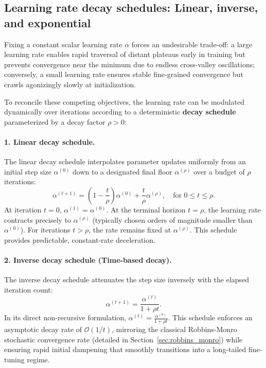 \subsection{Learning rate decay schedules: Linear, inverse, and exponential}
\label{sec:learning_rate_decay_schedules}

Fixing a constant scalar learning rate $\alpha$ forces an undesirable trade-off: a large learning rate enables rapid traversal of distant plateaus early in training but prevents convergence near the minimum due to endless cross-valley oscillations; conversely, a small learning rate ensures stable fine-grained convergence but crawls agonizingly slowly at initialization.

To reconcile these competing objectives, the learning rate can be modulated dynamically over iterations according to a deterministic \textbf{decay schedule} parameterized by a decay factor $\rho > 0$:

\paragraph{1. Linear decay schedule.}
The linear decay schedule interpolates parameter updates uniformly from an initial step size $\alpha^{(0)}$ down to a designated final floor $\alpha^{(\rho)}$ over a budget of $\rho$ iterations:
\begin{equation}
\alpha^{(t+1)} = \left(1 - \frac{t}{\rho}\right)\alpha^{(0)} + \frac{t}{\rho}\alpha^{(\rho)}, \quad \text{for } 0 \le t \le \rho.
\label{eq:linear_decay_schedule}
\end{equation}
At iteration $t = 0$, $\alpha^{(1)} = \alpha^{(0)}$. At the terminal horizon $t = \rho$, the learning rate contracts precisely to $\alpha^{(\rho)}$ (typically chosen orders of magnitude smaller than $\alpha^{(0)}$). For iterations $t > \rho$, the rate remains fixed at $\alpha^{(\rho)}$. This schedule provides predictable, constant-rate deceleration.

\paragraph{2. Inverse decay schedule (Time-based decay).}
The inverse decay schedule attenuates the step size inversely with the elapsed iteration count:
\begin{equation}
\alpha^{(t+1)} = \frac{\alpha^{(t)}}{1 + \rho t}.
\label{eq:inverse_decay_schedule}
\end{equation}
In its direct non-recursive formulation, $\alpha^{(t)} = \frac{\alpha^{(0)}}{1 + \rho t}$. This schedule enforces an asymptotic decay rate of $\mathcal{O}(1/t)$, mirroring the classical Robbins-Monro stochastic convergence rate (detailed in Section~\ref{sec:robbins_monro}) while ensuring rapid initial dampening that smoothly transitions into a long-tailed fine-tuning regime.

